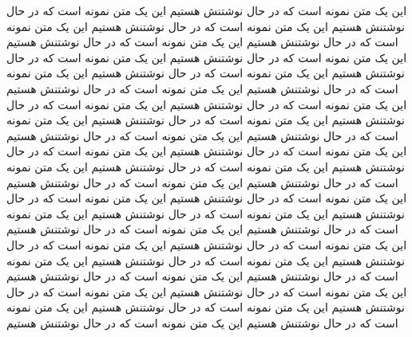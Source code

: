 این یک متن نمونه است که در حال نوشتنش هستیم  این یک متن نمونه است که در حال نوشتنش هستیم این یک متن نمونه است که در حال نوشتنش هستیم این یک متن نمونه است که در حال نوشتنش هستیم این یک متن نمونه است که در حال نوشتنش هستیم این یک متن نمونه است که در حال نوشتنش هستیم این یک متن نمونه است که در حال نوشتنش هستیم
این یک متن نمونه است که در حال نوشتنش هستیم  این یک متن نمونه است که در حال نوشتنش هستیم این یک متن نمونه است که در حال نوشتنش هستیم این یک متن نمونه است که در حال نوشتنش هستیم این یک متن نمونه است که در حال نوشتنش هستیم این یک متن نمونه است که در حال نوشتنش هستیم این یک متن نمونه است که در حال نوشتنش هستیم
این یک متن نمونه است که در حال نوشتنش هستیم  این یک متن نمونه است که در حال نوشتنش هستیم این یک متن نمونه است که در حال نوشتنش هستیم این یک متن نمونه است که در حال نوشتنش هستیم این یک متن نمونه است که در حال نوشتنش هستیم این یک متن نمونه است که در حال نوشتنش هستیم این یک متن نمونه است که در حال نوشتنش هستیم
این یک متن نمونه است که در حال نوشتنش هستیم  این یک متن نمونه است که در حال نوشتنش هستیم این یک متن نمونه است که در حال نوشتنش هستیم این یک متن نمونه است که در حال نوشتنش هستیم این یک متن نمونه است که در حال نوشتنش هستیم این یک متن نمونه است که در حال نوشتنش هستیم این یک متن نمونه است که در حال نوشتنش هستیم
این یک متن نمونه است که در حال نوشتنش هستیم  این یک متن نمونه است که در حال نوشتنش هستیم این یک متن نمونه است که در حال نوشتنش هستیم این یک متن نمونه است که در حال نوشتنش هستیم این یک متن نمونه است که در حال نوشتنش هستیم این یک متن نمونه است که در حال نوشتنش هستیم این یک متن نمونه است که در حال نوشتنش هستیم

